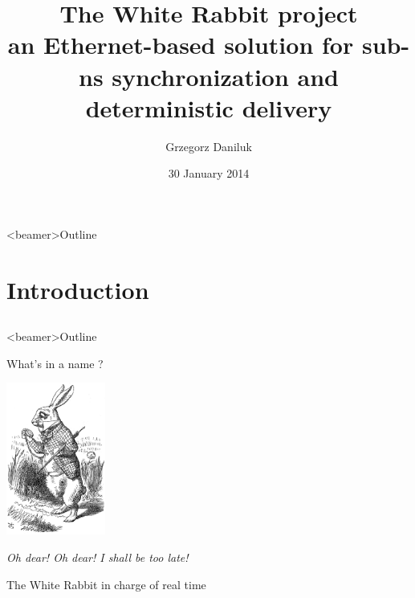 \documentclass[compress,red]{beamer}
\title[White Rabbit \hspace{2em}\insertframenumber/\inserttotalframenumber]
{The White Rabbit project\\ \small an Ethernet-based solution for sub-ns synchronization and deterministic delivery}
\author[G. Daniluk]{Grzegorz Daniluk}
\institute{CERN BE-CO Hardware and Timing section}
\date{30 January 2014}
\begin{document}
\frame{\titlepage}
\begin{frame}<beamer>{Outline}
    \tableofcontents %
\end{frame}

\section{Introduction}
\subsection{}
\begin{frame}<beamer>{Outline}
    \tableofcontents [currentsection]
\end{frame}


\begin{frame}{What's in a name ?}
\begin{center}
\includegraphics[height=5cm]{misc/Alice-wr.jpg}
\end{center}
\begin{center}
\textit{Oh dear! Oh dear! I shall be too late!}\\
\begin{small}
The White Rabbit in charge of real time
\end{small}
\end{center}
\end{frame}
\end{document}
